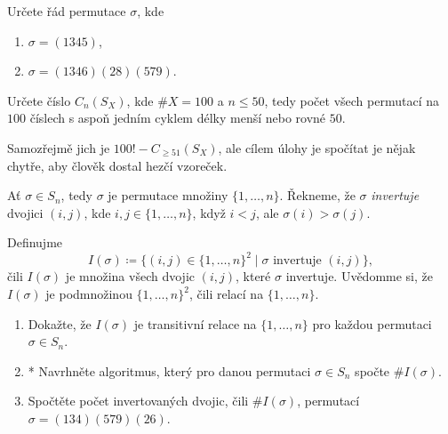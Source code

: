 \begin{exercise}
 Určete řád permutace $\sigma$, kde
 \begin{enumerate}[label=(\arabic*),topsep=0pt]
  \item $\sigma = (1345)$,
  \item $\sigma = (1346)(28)(579)$.
 \end{enumerate}
\end{exercise}

\begin{exercise}[těžké]
 Určete číslo $C_n(S_X)$, kde $\# X = 100$ a $n \leq 50$, tedy počet všech
 permutací na $100$ číslech s aspoň jedním cyklem délky menší nebo rovné
 $50$.

 Samozřejmě jich je $100! - C_{ \geq 51}(S_X)$, ale cílem úlohy je spočítat je
 nějak chytře, aby člověk dostal hezčí vzoreček.
\end{exercise}

\begin{exercise}
 Ať $\sigma \in S_n$, tedy $\sigma$ je permutace množiny $\{1,\ldots,n\}$.
 Řekneme, že $\sigma$ \emph{invertuje} dvojici $(i,j)$, kde $i,j \in
 \{1,\ldots,n\}$, když $i<j$, ale $\sigma(i)>\sigma(j)$.

 Definujme
  \[
   I(\sigma) \coloneqq \{(i,j) \in \{1,\ldots,n\}^2 \mid \sigma \text{ invertuje
   } (i,j)\},
 \]
 čili $I(\sigma)$ je množina všech dvojic $(i,j)$, které $\sigma$ invertuje.
 Uvědomme si, že $I(\sigma)$ je podmnožinou $\{1,\ldots,n\}^2$, čili relací na
 $\{1,\ldots,n\}$.
 \begin{enumerate}[label=(\arabic*),topsep=0pt]
  \item Dokažte, že $I(\sigma)$ je transitivní relace na $\{1,\ldots,n\}$ pro
   každou permutaci $\sigma \in S_n$.
  \item* Navrhněte algoritmus, který pro danou permutaci $\sigma \in S_n$ spočte
   $\# I(\sigma)$.
  \item Spočtěte počet invertovaných dvojic, čili $\# I(\sigma)$, permutací
   $\sigma = (134)(579)(26)$.
 \end{enumerate}
\end{exercise}
